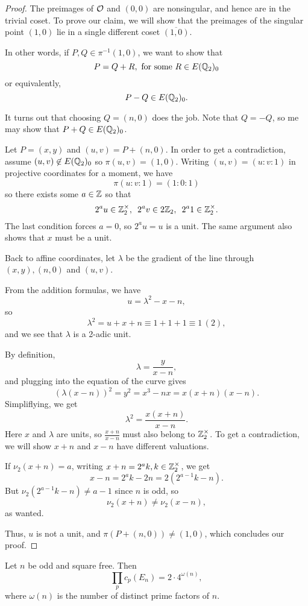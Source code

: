 \documentclass[12pt, a4paper]{amsart}
\begin{document}
\begin{proof}
  The preimages of ${\mathcal O}$ and $(0,0)$ are nonsingular, and hence are in the
  trivial coset.
  To prove
  our claim, we will show that the preimages of the singular point $(1,0)$ lie
  in a single different coset $\overline{(1,0)}.$

  In other words, if $P, Q \in \pi^{-1}(1,0)$, we want to show that
  \[P = Q + R, \text{ for some } R \in E({\mathbb Q}_2)_0 \]
  or equivalently, 
  \[P - Q \in E({\mathbb Q}_2)_0.\]

  It turns out that choosing $Q = (n,0)$ does the job. Note that $Q = -Q$, so me
  may show that $P+Q \in E({\mathbb Q}_2)_0$.

  Let $P = (x,y)$ and $(u,v) = P + (n,0)$. In order to get a contradiction, assume
  $(u,v) \not\in E({\mathbb Q}_2)_0$ so $\pi(u,v) = (1,0)$. Writing $(u,v) = (u:v:1)$ in
  projective coordinates for a moment, we have
  \[\pi(u:v:1) = (1:0:1)\]
  so there exists some $a \in {\mathbb Z}$ so that
  \[2^a u \in {\mathbb Z}_2^\times, \,\,\, 2^av \in 2{\mathbb Z}_2, \,\,\, 2^a1 \in {\mathbb Z}_2^\times.\]
  The last condition forces $a = 0$, so $2^au = u$ is a unit. The same argument
  also shows that $x$ must be a unit.
  
  Back to affine coordinates, let $\lambda$ be the gradient of the
  line through $(x,y), (n,0)$ and $(u,v)$.

  From the addition formulas, we have
  \[u = \lambda^2 - x - n,\]
  so $$\lambda^2 = u + x + n \equiv 1 + 1 + 1 \equiv 1 \, (2),$$ and we see that $\lambda$
  is a 2-adic unit.

  By definition, 
  \[\lambda = \frac{y}{x-n}, \]
  and plugging into the equation of the curve gives 
  \[(\lambda(x-n))^2 = y^2 = x^3 -nx = x(x+n)(x-n).\]
  Simpliflying, we get
  \[\lambda^2 = \frac{x(x+n)}{x-n}.\]
  Here $x$ and $\lambda$ are units, so $\frac{x+n}{x-n}$ must also belong to ${\mathbb Z}_2^\times$.
  To get a contradiction, we will show $x+n$ and $x-n$ have different valuations.

  If $\nu_2(x+n) = a$, writing $x+n = 2^ak, k
  \in {\mathbb Z}_2^\times$, we get
  \[x-n = 2^ak -2n = 2(2^{a-1}k - n).\]
  But $\nu_2(2^{a-1}k-n) \neq a-1$ since $n$ is odd, so
  \[\nu_2(x+n) \neq \nu_2(x-n),\]
  as wanted.

  Thus, $u$ is not a unit, and $\pi(P+(n,0)) \neq (1,0)$, which concludes our proof.
\end{proof}

\begin{cor}
  Let $n$ be odd and square free. Then
  \[\prod\limits_p c_p(E_n) = 2 \cdot 4^{\omega(n)}, \]
  where $\omega(n)$ is the number of distinct prime factors of $n$.
\end{cor}
\end{document}
